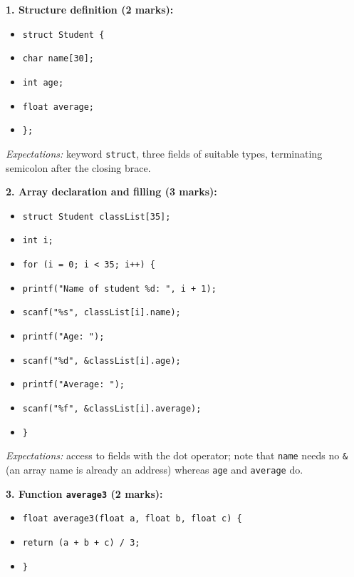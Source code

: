 \documentclass[11pt]{article}
\begin{document}
\begin{corrige}
\textbf{1. Structure definition (2 marks):}
\begin{itemize}
\item \texttt{struct Student \{}
\item \texttt{\quad char name[30];}
\item \texttt{\quad int age;}
\item \texttt{\quad float average;}
\item \texttt{\};}
\end{itemize}
\emph{Expectations:} keyword \texttt{struct}, three fields of suitable types, terminating semicolon after the closing brace.

\textbf{2. Array declaration and filling (3 marks):}
\begin{itemize}
\item \texttt{struct Student classList[35];}
\item \texttt{int i;}
\item \texttt{for (i = 0; i < 35; i++) \{}
\item \texttt{\quad printf("Name of student \%d: ", i + 1);}
\item \texttt{\quad scanf("\%s", classList[i].name);}
\item \texttt{\quad printf("Age: ");}
\item \texttt{\quad scanf("\%d", \&classList[i].age);}
\item \texttt{\quad printf("Average: ");}
\item \texttt{\quad scanf("\%f", \&classList[i].average);}
\item \texttt{\}}
\end{itemize}
\emph{Expectations:} access to fields with the dot operator; note that \texttt{name} needs no \texttt{\&} (an array name is already an address) whereas \texttt{age} and \texttt{average} do.

\textbf{3. Function \texttt{average3} (2 marks):}
\begin{itemize}
\item \texttt{float average3(float a, float b, float c) \{}
\item \texttt{\quad return (a + b + c) / 3;}
\item \texttt{\}}
\end{itemize}


\end{corrige}
\end{document}
